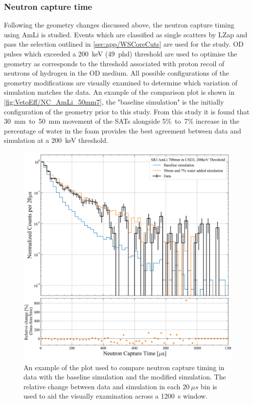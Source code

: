 \subsubsection{Neutron capture time}\label{sec:VetoEff/NCT}
Following the geometry changes discussed above, the neutron capture timing using AmLi is studied. Events which are classified as single scatters by LZap and pass the selection outlined in \autoref{sec:app/WSCoreCuts} are used for the study. OD pulses which exceeded a 200~keV (49~phd) threshold are used to optimise the geometry as corresponds to the threshold associated with proton recoil of neutrons of hydrogen in the OD medium.
All possible configurations of the geometry modifications are visually examined to determine which variation of simulation matches the data. An example of the comparison plot is shown in \autoref{fig:VetoEff/NC_AmLi_50mm7}, the "baseline simulation" is the initially configuration of the geometry prior to this study. %
From this study it is found that 30~mm~to~50~mm movement of the SATs alongside 5\%~to~7\% increase in the percentage of water in the foam provides the best agreement between data and simulation at a 200~keV threshold.
\begin{figure}[!ht]
	\centering
	\includegraphics[width=0.7\linewidth]{figures/VetoEfficiency/movedSAT50mm_7percentWater_AmLi_CSD3_Z700mm_200keV_Ratio.png}
	\caption{An example of the plot used to compare neutron capture timing in data with the baseline simulation and the modified simulation. The relative change between data and simulation in each $20~\mu s$ bin is used to aid the visually examination across a 1200~\textmu s window.}
	\label{fig:VetoEff/NC_AmLi_50mm7}
\end{figure}

